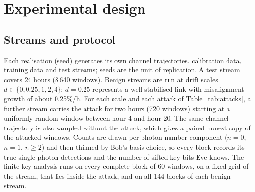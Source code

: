 \section{Experimental design}\label{sec:setup}

\subsection{Streams and protocol}
Each realisation (seed) generates its own channel trajectories, calibration data, training data and test streams; seeds are the unit of replication. A test stream covers 24 hours (8\,640 windows). Benign streams are run at drift scales $d\in\{0,0.25,1,2,4\}$; $d=0.25$ represents a well-stabilised link with misalignment growth of about 0.25\%/h. For each scale and each attack of Table~\ref{tab:attacks}, a further stream carries the attack for two hours (720 windows) starting at a uniformly random window between hour 4 and hour 20. The same channel trajectory is also sampled without the attack, which gives a paired honest copy of the attacked windows. Counts are drawn per photon-number component ($n=0$, $n=1$, $n\geq2$) and then thinned by Bob's basis choice, so every block records its true single-photon detections and the number of sifted key bits Eve knows. The finite-key analysis runs on every complete block of 60 windows, on a fixed grid of the stream, that lies inside the attack, and on all 144 blocks of each benign stream.

